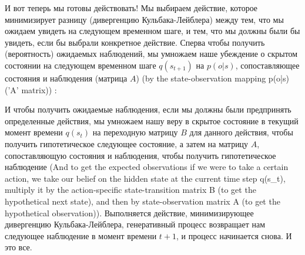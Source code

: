 \documentclass[12pt]{article}
\begin{document}
И вот теперь мы готовы действовать! Мы выбираем действие, которое минимизирует разницу (дивергенцию Кульбака-Лейблера) между тем, что мы ожидаем увидеть на следующем временном шаге, и тем, что мы должны были бы увидеть, если бы выбрали конкретное действие. Сперва чтобы получить (вероятность) ожидаемых наблюдений, мы умножаем наше убеждение о скрытом состоянии на следующем временном шаге $q(s_{t+1})$ на $p(o|s)$, сопоставляющее состояния и наблюдения (матрица $A$) (by the state-observation mapping p(o|s) ('A' matrix)) :

\begin{figure}[h]
\end{figure}


И чтобы получить ожидаемые наблюдения, если мы должны были предпринять определенные действия, мы умножаем нашу веру в скрытое состояние в текущий момент времени $q(s_t)$ на переходную матрицу $B$ для данного действия, чтобы получить гипотетическое следующее состояние, а затем на матрицу $A$, сопоставляющую состояния и наблюдения, чтобы получить гипотетическое наблюдение (And to get the expected observations if we were to take a certain action, we take our belief on the hidden state at the current time step q(s\_t), multiply it by the action-specific state-transition matrix B (to get the hypothetical next state), and then by state-observation matrix A (to get the hypothetical observation)). Выполняется действие, минимизирующее дивергенцию Кульбака-Лейблера, генеративный процесс возвращает нам следующее наблюдение в момент времени $t+1$, и процесс начинается снова. И это все.

\begin{figure}[h]
\end{figure}
\end{document}
